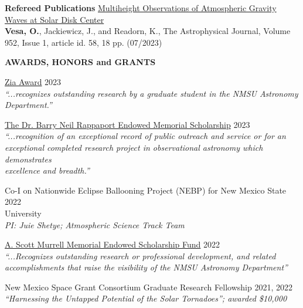 \documentclass{resume} %
\begin{document}

\vspace{-0.1in}
\begin{rSection}{\textbf{Refereed Publications}}
\vspace{0.02in}
\href{https://iopscience.iop.org/article/10.3847/1538-4357/acd930}{Multiheight Observations of Atmospheric Gravity Waves at Solar Disk Center} \\ {\bf Vesa, O.}, Jackiewicz, J., and Readorn, K., The Astrophysical Journal, Volume 952, Issue 1, article id. 58, 18 pp. (07/2023)
\end{rSection} 


\vspace{-0.1in}
\begin{rSection}{\textbf{AWARDS, HONORS and GRANTS}}
\vspace{0.02in}

{\href{https://astro.nmsu.edu/fellowships/zia.html}{Zia Award}}
\hfill{2023} \\
\emph{``...recognizes outstanding research by a graduate student in the NMSU Astronomy \\ Department.''}


{\href{https://astro.nmsu.edu/fellowships/rappaport.html}{The Dr. Barry Neil Rappaport Endowed Memorial Scholarship}}
\hfill{2023} \\
\emph{``...recognition of an exceptional record of public outreach and service or for an \\ exceptional completed research project in observational astronomy which demonstrates \\ excellence and breadth.''}

{Co-I on Nationwide Eclipse Ballooning Project (NEBP) for New Mexico State \hfill{2022} \\ University} \\
\emph{PI: Juie Shetye;} \emph{Atmospheric Science Track Team}

{\href{https://astro.nmsu.edu/fellowships/murrell.html}{A. Scott Murrell Memorial Endowed Scholarship Fund}}
\hfill{2022} \\
\emph{``...Recognizes outstanding research or professional development, and related \\ accomplishments that raise the visibility of the NMSU Astronomy Department''}

{New Mexico Space Grant Consortium Graduate Research Fellowship } \hfill{2021, 2022} \\
\emph{``Harnessing the Untapped Potential of the Solar Tornadoes''; awarded \$10,000}
\end{rSection}
\end{document}
